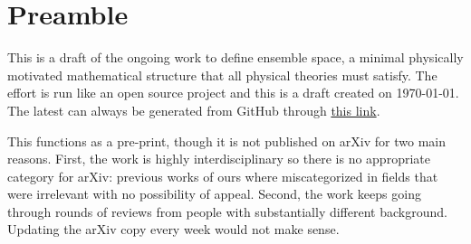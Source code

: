 \documentclass[11pt,letterpaper,fleqn]{memoir}
\begin{document}
%	
	
%	
\chapter*{Preamble}

This is a draft of the ongoing work to define ensemble space, a minimal physically motivated mathematical structure that all physical theories must satisfy. The effort is run like an open source project and this is a draft created on \today. The latest can always be generated from GitHub through \href{https://latexonline.cc/compile?git=https%3A%2F%2Fgithub.com%2Fassumptionsofphysics%2Fbook&target=art_pm_EnsembleSpaces.tex&command=pdflatex}{this link}.

This functions as a pre-print, though it is not published on arXiv for two main reasons. First, the work is highly interdisciplinary so there is no appropriate category for arXiv: previous works of ours where miscategorized in fields that were irrelevant with no possibility of appeal. Second, the work keeps going through rounds of reviews from people with substantially different background. Updating the arXiv copy every week would not make sense.

\setcounter{tocdepth}{3}
\tableofcontents
	
	
	
	
\end{document}
